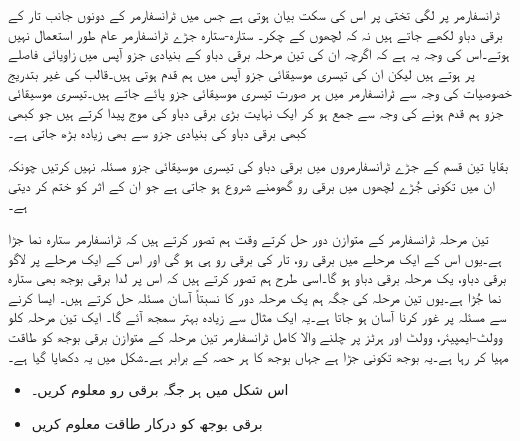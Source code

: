 	ٹرانسفارمر پر لگی تختی پر اس کی سکت بیان ہوتی ہے جس میں ٹرانسفارمر کے دونوں جانب تار کے برقی دباو لکھے جاتے ہیں نہ کہ لچھوں کے چکر۔
%
ستارہ-ستارہ جڑے ٹرانسفارمر عام طور استعمال نہیں ہوتے۔اس کی وجہ یہ ہے کہ اگرچہ ان کی تین مرحلہ برقی دباو  کے بنیادی جزو آپس میں   زاویائی فاصلے پر ہوتے ہیں لیکن ان کی تیسری موسیقائی جزو آپس میں ہم قدم ہوتی ہیں۔قالب کی غیر بتدریج خصوصیات کی وجہ سے ٹرانسفارمر میں ہر صورت تیسری موسیقائی جزو پائے جاتے ہیں۔تیسری موسیقائی جزو ہم قدم ہونے کی وجہ سے جمع ہو کر ایک نہایت بڑی برقی دباو کی موج پیدا کرتے ہیں جو کبھی کبھی برقی دباو کی بنیادی جزو سے بھی زیادہ بڑھ جاتی ہے۔

بقایا تین قسم کے جڑے ٹرانسفارمروں میں برقی دباو کی تیسری موسیقائی جزو مسئلہ نہیں کرتیں چونکہ ان میں تکونی جُڑے لچھوں میں برقی رو گھومنے شروع ہو جاتی ہے جو ان کے اثر کو ختم کر دیتی ہے۔

تین مرحلہ ٹرانسفارمر کے متوازن دور حل کرتے وقت ہم تصور کرتے ہیں کہ ٹرانسفارمر ستارہ نما جڑا  ہے۔یوں اس کے ایک مرحلے میں برقی رو، تار  کی برقی رو ہی ہو گی اور اس کے ایک مرحلے پر لاگو برقی دباو، یک مرحلہ برقی دباو  ہو گا۔اسی طرح ہم تصور کرتے ہیں کہ اس پر لدا برقی بوجھ بھی ستارہ نما جُڑا ہے۔یوں تین مرحلہ کی جگہ ہم یک مرحلہ دور کا نسبتاً آسان مسئلہ حل کرتے ہیں۔ ایسا کرنے سے مسئلہ پر غور کرنا آسان ہو جاتا ہے۔یہ ایک مثال سے زیادہ بہتر سمجھ آئے گا۔
%
ایک تین مرحلہ     کلو وولٹ-ایمپیئر،    وولٹ اور  ہرٹز پر چلنے والا کامل ٹرانسفارمر تین مرحلہ کے متوازن برقی بوجھ کو طاقت مہیا کر رہا ہے۔یہ بوجھ تکونی جڑا ہے جہاں بوجھ کا ہر حصہ  کے برابر ہے۔شکل   میں یہ دکھایا گیا ہے۔
\begin{itemize}
\item
اس شکل میں ہر جگہ برقی رو معلوم کریں۔
\item
برقی بوجھ کو درکار طاقت معلوم کریں
\end{itemize}

